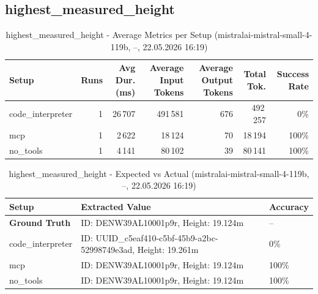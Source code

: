 \documentclass[a4paper,11pt]{article}
\begin{document}
\clearpage

\subsection{highest\_measured\_height}

\begin{table}[H]
\centering
\scriptsize
\caption{highest\_measured\_height - Average Metrics per Setup (mistralai-mistral-small-4-119b, --, 22.05.2026 16:19)}
\label{tab:combined\_highest\_measured\_height\_metrics\_20260522}
\begin{tabular}{l r r r r r r}
\toprule
Setup & Runs & Avg Dur. (ms) & Average Input Tokens & Average Output Tokens & Total Tok. & Success Rate \\
\midrule
code\_interpreter & 1 & 26\,707 & 491\,581 & 676 & 492\,257 & 0\% \\
mcp & 1 & 2\,622 & 18\,124 & 70 & 18\,194 & 100\% \\
no\_tools & 1 & 4\,141 & 80\,102 & 39 & 80\,141 & 100\% \\
\bottomrule
\end{tabular}
\end{table}

\begin{table}[H]
\centering
\scriptsize
\caption{highest\_measured\_height - Detailed Runs Comparison (mistralai-mistral-small-4-119b, --, 22.05.2026 16:19)}
\end{table}

\begin{table}[H]
\centering
\scriptsize
\caption{highest\_measured\_height - Expected vs Actual (mistralai-mistral-small-4-119b, --, 22.05.2026 16:19)}
\begin{tabular}{l l l}
\toprule
Setup & Extracted Value & Accuracy \\
\midrule
\textbf{Ground Truth} & ID: DENW39AL10001p9r, Height: 19.124m & -- \\
\midrule
code\_interpreter & ID: UUID\_c5eaf410-c5bf-45b9-a2bc-52998749e3ad, Height: 19.261m & 0\% \\
mcp & ID: DENW39AL10001p9r, Height: 19.124m & 100\% \\
no\_tools & ID: DENW39AL10001p9r, Height: 19.124m & 100\% \\
\bottomrule
\end{tabular}
\end{table}
\end{document}
